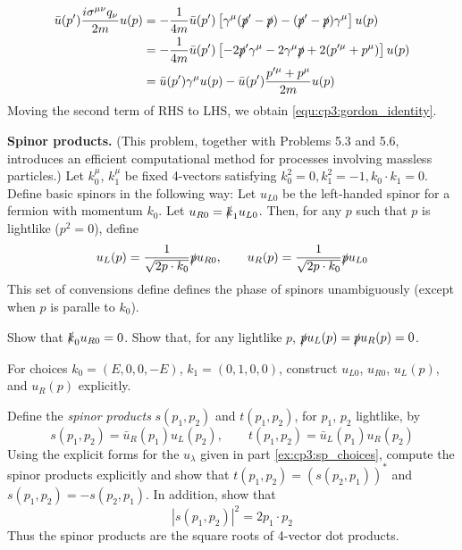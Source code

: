 \solution
\begin{align*}
    \bar{u}(p')\frac{i\sigma^{\mu\nu}q_\nu}{2m} u(p) 
    & = -\frac{1}{4m} \bar{u}(p') \left[\gamma^\mu(\slashed{p}' - \slashed{p}) - (\slashed{p}' - \slashed p) \gamma^\mu \right] u(p)\\
    & = -\frac{1}{4m} \bar{u}(p') \left[-2\slashed{p}'\gamma^\mu - 2\gamma^\mu\slashed{p} + 2(p'^\mu + p^\mu) \right] u(p)\\
    & = \bar{u}(p')\gamma^\mu u(p) - \bar{u}(p')\frac{p'^\mu + p^\mu}{2m}u(p)
\end{align*}
Moving the second term of RHS to LHS, we obtain \eqref{equ:cp3:gordon_identity}.

\problem \textbf{Spinor products.} (This problem, together with Problems 5.3 and 5.6, introduces an efficient computational method for
processes involving massless particles.) Let $k_0^\mu$, $k_1^\mu$ be fixed 4-vectors satisfying $k_0^2 = 0, k_1^2 = -1, k_0\cdot k_1 = 0$.
Define basic spinors in the following way: Let $u_{L0}$ be the left-handed spinor for a fermion with momentum $k_0$. Let $u_{R0} = \slashed{k}_1 u_{L0}$.
Then, for any $p$ such that $p$ is lightlike ($p^2 = 0$), define
\begin{equation*}
    u_L(p) = \frac{1}{\sqrt{2p\cdot k_0}} \slashed{p} u_{R0}, \qquad u_R(p) = \frac{1}{\sqrt{2p\cdot k_0}}  \slashed{p} u_{L0}
\end{equation*}
This set of convensions define defines the phase of spinors unambiguously (except when $p$ is paralle to $k_0$).
\begin{problembody}
    \item Show that $\slashed{k}_0 u_{R0} = 0$. Show that, for any lightlike $p$, $\slashed{p}u_L(p) = \slashed{p}u_R(p) = 0$.
    \item \label{ex:cp3:sp_choices} For choices $k_0 = (E, 0, 0, -E)$, $k_1 = (0, 1, 0, 0)$, construct $u_{L0}$, $u_{R0}$, $u_L(p)$, and $u_R(p)$ explicitly.
    \item Define the \textit{spinor products} $s(p_1, p_2)$ and $t(p_1, p_2)$, for $p_1$, $p_2$ lightlike, by
    \begin{equation*}
        s(p_1, p_2) = \bar{u}_R(p_1) u_L(p_2), \qquad t(p_1, p_2) = \bar{u}_L(p_1) u_R(p_2)
    \end{equation*}
    Using the explicit forms for the $u_\lambda$ given in part \ref{ex:cp3:sp_choices}, compute the spinor products explicitly and show that
    $t(p_1, p_2) = (s(p_2, p_1))^\ast$ and $s(p_1, p_2) = -s(p_2, p_1)$. In addition, show that
    \begin{equation*}
        \left| s(p_1, p_2) \right|^2 = 2p_1 \cdot p_2
    \end{equation*}
    Thus the spinor products are the square roots of 4-vector dot products.
\end{problembody}

